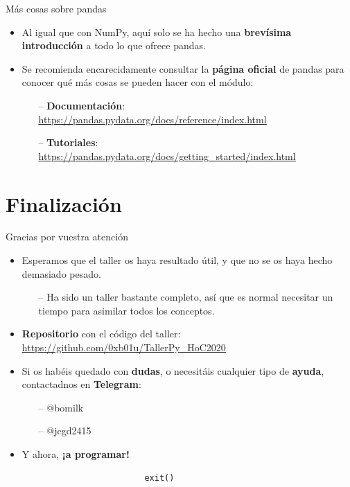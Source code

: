 \documentclass[10pt]{beamer} %
\begin{document}
\begin{frame}{Más cosas sobre pandas}
    \begin{itemize}
        \item Al igual que con NumPy, aquí solo se ha hecho una \textbf{brevísima introducción} a todo lo que ofrece pandas.
        \item Se recomienda encarecidamente consultar la \textbf{página oficial} de pandas para conocer qué más cosas se pueden hacer con el módulo:
        \begin{itemize}
            \item[--] \textbf{Documentación}: \underline{\url{https://pandas.pydata.org/docs/reference/index.html}}
            \item[--] \textbf{Tutoriales}: \underline{\url{https://pandas.pydata.org/docs/getting\_started/index.html}}
        \end{itemize}
    \end{itemize}
\end{frame}

\section{Finalización}

\begin{frame}[fragile]{Gracias por vuestra atención}
    \begin{itemize}
        \item Esperamos que el taller os haya resultado útil, y que no se os haya hecho demasiado pesado.
        \begin{itemize}
            \item[--] Ha sido un taller bastante completo, así que es normal necesitar un tiempo para asimilar todos los conceptos.
        \end{itemize}
        \item \textbf{Repositorio} con el código del taller: \underline{\url{https://github.com/0xb01u/TallerPy\_HoC2020}}
        \item Si os habéis quedado con \textbf{dudas}, o necesitáis cualquier tipo de \textbf{ayuda}, contactadnos en \textbf{Telegram}:
        \begin{itemize}
            \item[--] @bomilk
            \item[--] @jcgd2415
        \end{itemize}
        \item[]
        \item Y ahora, \textbf{¡a programar!}
    \end{itemize}
    \begin{verbatim}
                            exit()
    \end{verbatim}
\end{frame}
\end{document}
